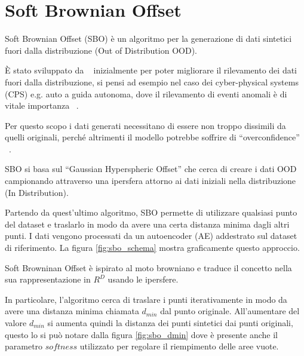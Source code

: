 \chapter{Soft Brownian Offset}

Soft Brownian Offset (SBO) è un algoritmo per la generazione di dati sintetici fuori dalla distribuzione (Out of Distribution OOD). 

È stato sviluppato da ~\cite{sbo} inizialmente per poter migliorare il rilevamento dei dati fuori dalla distribuzione, si pensi ad esempio nel caso dei cyber-physical systems (CPS) e.g. auto a guida autonoma, dove il rilevamento di eventi anomali è di vitale importanza ~\cite{yuhasEmbeddedOutofdistributionDetection2021}.

Per questo scopo i dati generati necessitano di essere non troppo dissimili da quelli originali, perché altrimenti il modello potrebbe soffrire di ``overconfidence'' ~\cite{amodeiConcreteProblemsAI2016}.

SBO si basa sul ``Gaussian Hyperspheric Offset'' che cerca di creare i dati OOD campionando attraverso una ipersfera attorno ai dati iniziali nella distribuzione (In Distribution).

Partendo da quest'ultimo algoritmo, SBO permette di utilizzare qualsiasi punto del dataset e traslarlo in modo da avere una certa distanza minima dagli altri punti. I dati vengono processati da un autoencoder (AE) addestrato sul dataset di riferimento. La figura \ref{fig:sbo_schema} mostra graficamente questo approccio. 

Soft Browninan Offset è ispirato al moto browniano e traduce il concetto nella sua rappresentazione in $R^D$ usando le ipersfere.

In particolare, l'algoritmo cerca di traslare i punti iterativamente in modo da avere una distanza minima chiamata $d_{min}$ dal punto originale. All'aumentare del valore $d_{min}$ si aumenta quindi la distanza dei punti sintetici dai punti originali, questo lo si può notare dalla figura \ref{fig:sbo_dmin} dove è presente anche il parametro $softness$ utilizzato per regolare il riempimento delle aree vuote.


